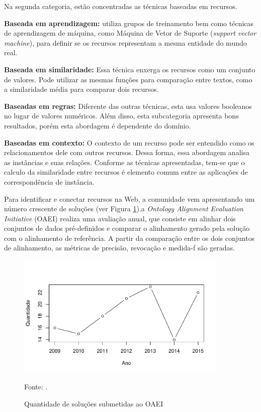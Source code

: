 Na segunda categoria, estão concentradas as técnicas baseadas em recursos. 
% 
% 

\textbf{Baseada em aprendizagem:} utiliza grupos de treinamento bem como técnicas de aprendizagem de máquina, como Máquina de Vetor de Suporte (\textit{support vector machine}), para definir se os recursos representam a mesma entidade do mundo real.

\textbf{Baseada em similaridade:} Essa técnica enxerga os recursos como um conjunto de valores. Pode utilizar as mesmas funções para comparação entre textos, como a similaridade média para comparar dois recursos. 

\textbf{Baseadas em regras:} Diferente das outras técnicas, esta usa valores booleanos no lugar de valores numéricos. Além disso, esta subcategoria apresenta bons resultados, porém esta abordagem é dependente do domínio. 

\textbf{Baseadas em contexto:} O contexto de um recurso pode ser entendido como os relacionamentos dele com outros recursos. Dessa forma, essa abordagem analisa as instâncias e suas relações.
Conforme as técnicas apresentadas, tem-se que o calculo da similaridade entre recursos é elemento comum entre as aplicações de correspondência de instância.

Para identificar e conectar recursos na Web, a comunidade vem apresentando um número crescente de soluções (ver Figura \ref{fig:oaei_imtools}).a \textit{Ontology Alignment Evaluation Initiative} (OAEI) realiza uma avaliação anual, que consiste em alinhar dois conjuntos de dados pré-definidos e comparar o alinhamento gerado pela solução com o alinhamento de referência. A partir da comparação entre os dois conjuntos de alinhamento, as métricas de precisão, revocação e medida-f são geradas.


\begin{figure}[!h]
        \centering
        \includegraphics[width=0.9\textwidth]{./imagens/im_tools.pdf}
    \caption{Quantidade de soluções submetidas ao OAEI}
        \footnotesize{Fonte: \cite{cheatham2015results}.}
        \label{fig:oaei_imtools}
\end{figure}

